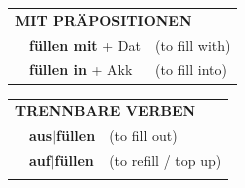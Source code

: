 \documentclass[10pt,a4paper]{revtex4-2}
\begin{document}
\begin{verbbox}
   \vspace{10pt}

   \begin{tabular}{lll}
      \multicolumn{3}{l}{\textbf{MIT PRÄPOSITIONEN}}\\
& \textbf{füllen mit} + Dat & (to fill with)\\
& \textbf{füllen in} + Akk & (to fill into)\\
\end{tabular}
  \hfill
   \begin{tabular}{lll}
      \multicolumn{3}{l}{\textbf{TRENNBARE VERBEN}}\\
 & \textbf{aus$|$füllen} & (to fill out)\\
 & \textbf{auf$|$füllen} & (to refill / top up)\\
\vspace{10pt}
  \end{tabular}

  \vspace{-5pt}

\end{verbbox}
\end{document}
